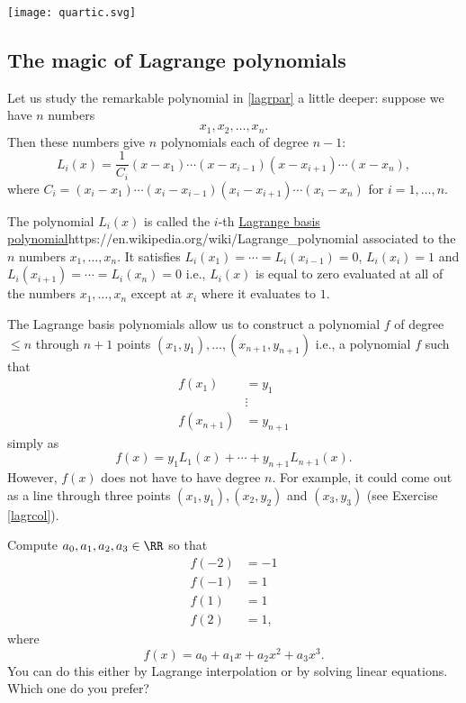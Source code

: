 \documentclass{article}
\begin{document}
\texttt{[image: quartic.svg]}


\subsection{The magic of Lagrange polynomials}

Let us study the remarkable polynomial in \eqref{lagrpar} a little deeper: suppose we have $n$ numbers
\begin{equation}\label{Lpts}
x_1, x_2, \dots, x_n.
\end{equation}
Then these numbers give $n$ polynomials each of degree $n-1$:
$$
L_i(x) = \frac{1}{C_i} (x-x_1) \cdots (x-x_{i-1})(x-x_{i+1}) \cdots (x - x_n),
$$
where
$C_i = (x_i-x_1) \cdots (x_i-x_{i-1})(x_i-x_{i+1}) \cdots (x_i - x_n)$ for
$i = 1, \dots, n$.

The polynomial $L_i(x)$ is called the $i$-th
\url{Lagrange basis polynomial}{https://en.wikipedia.org/wiki/Lagrange_polynomial}
associated to the $n$ numbers $x_1, \dots, x_n$.
It satisfies
$L_i(x_1) = \cdots = L_i(x_{i-1}) = 0$, $L_i(x_i) = 1$ and
$L_i(x_{i+1}) = \cdots = L_i(x_n) = 0$ i.e., $L_i(x)$ is equal to zero
evaluated at all of the numbers $x_1, \dots, x_n$ except at $x_i$
where it evaluates to $1$.


The Lagrange basis polynomials allow us to construct a polynomial $f$ of degree $\leq n$ through
$n+1$ points $(x_1, y_1), \dots, (x_{n+1}, y_{n+1})$ i.e., a polynomial $f$ such that
\begin{align*}
  f(x_1) &= y_1\\
         &\vdots\\
  f(x_{n+1}) &= y_{n+1}
\end{align*}
simply as
$$
f(x) = y_1 L_1(x) + \cdots + y_{n+1} L_{n+1}(x).
$$
However, $f(x)$ does not have to have degree $n$. For example, it could come out as a line through
three points $(x_1, y_1), (x_2, y_2)$ and $(x_3, y_3)$ (see Exercise \ref{lagrcol}).

\beginshex
Compute $a_0, a_1, a_2, a_3\in \RR$ so that
\begin{align*}
f(-2) &= -1\\
f(-1) &= 1\\
f(1) &= 1\\
f(2) &= 1,
\end{align*}
where
$$
f(x) = a_0 + a_1 x + a_2 x^2 + a_3 x^3.
$$
You can do this either by Lagrange interpolation or by solving linear equations. Which one
do you prefer?
\endshex
\end{document}
